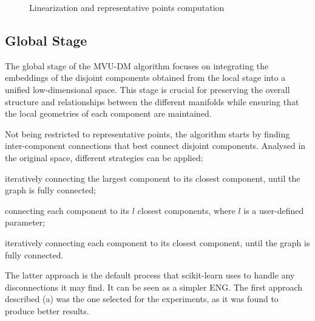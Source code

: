         \begin{figure}[htbp]
            \centering
            \caption{Linearization and representative points computation}
            \label{fig:intra-component_linearization}
        \end{figure}

        
    \subsection{Global Stage}
        The global stage of the \ac{MVU-DM} algorithm focuses on integrating the embeddings of the disjoint components obtained from the local stage into a unified low-dimensional space. This stage is crucial for preserving the overall structure and relationships between the different manifolds while ensuring that the local geometries of each component are maintained.

        Not being restricted to representative points, the algorithm starts by finding inter-component connections that best connect disjoint components. Analysed in the original space, different strategies can be applied:
        \begin{inparaenum}[(a)]
            \item iteratively connecting the largest component to its closest component, until the graph is fully connected;
            \item connecting each component to its $l$ closest components, where $l$ is a user-defined parameter;
            \item iteratively connecting each component to its closest component, until the graph is fully connected.
        \end{inparaenum}
        The latter approach is the default process that scikit-learn uses to handle any disconnections it may find. It can be seen as a simpler \ac{ENG}. The first approach described (a) was the one selected for the experiments, as it was found to produce better results.


